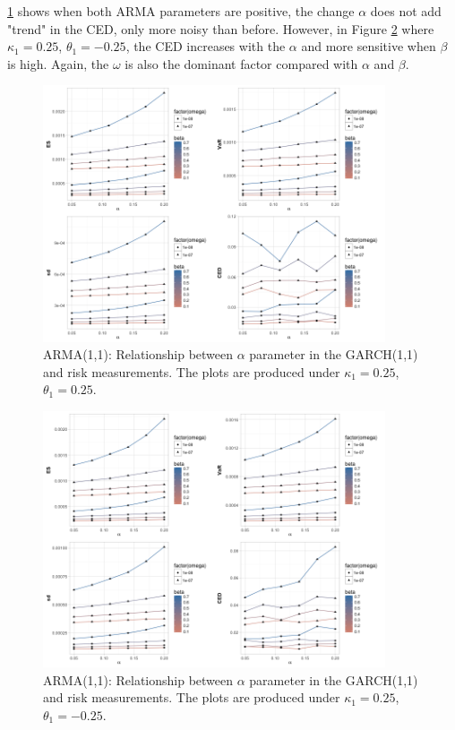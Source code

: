 \documentclass[11pt]{article}
\begin{document}
\ref{fig:garch_ARMA11_risk_measures_4_alpha} shows when both ARMA parameters are positive, the change $\alpha$ does not add "trend" in the CED, only more noisy than before.  However, in Figure \ref{fig:garch_ARMA11_risk_measures_3_alpha} where $\kappa_1 = 0.25$, $\theta_1 = -0.25$, the CED increases with the $\alpha$ and more sensitive when $\beta$ is high. Again, the $\omega$ is also the dominant factor compared with $\alpha$ and $\beta$.

\begin{figure}[H]
\centering
\includegraphics[width = 0.9\textwidth]{../figures/simulation_garch/garch_ARMA11_risk_measures_4_alpha}
\caption{ARMA(1,1): Relationship between $\alpha$ parameter in the GARCH(1,1) and risk measurements. The plots are produced under $\kappa_1 = 0.25$, $\theta_1 = 0.25$. }
\label{fig:garch_ARMA11_risk_measures_4_alpha}
\end{figure}

\begin{figure}[H]
\centering
\includegraphics[width = 0.9\textwidth]{../figures/simulation_garch/garch_ARMA11_risk_measures_3_alpha}
\caption{ARMA(1,1): Relationship between $\alpha$ parameter in the GARCH(1,1) and risk measurements. The plots are produced under $\kappa_1 = 0.25$, $\theta_1 = -0.25$. }
\label{fig:garch_ARMA11_risk_measures_3_alpha}
\end{figure}
\end{document}

